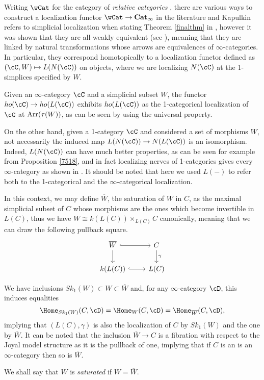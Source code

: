 \begin{rmk}
  Writing $\wCat$ for the category of \emph{relative categories}
  \cite{BK12}, there are various ways to construct a localization functor
  $\wCat\rightarrow\Cat_\infty$ in the literature and Kapulkin refers to
  simplicial localization when stating Theorem \ref{finalthm} in
  \cite{Kap14}, however it was shown that they are all weakly equivalent (see
  \cite[Ex.\ 1.6.3]{Bar16}), meaning
  that they are linked by natural transformations whose arrows are equivalences
  of $\infty$-categories. In particular, they correspond homotopically to a
  localization functor defined as $(\cC,W)\mapsto L(N(\cC))$ on objects, where
  we are localizing $N(\cC)$ at the 1-simplices specified by $W$.
\end{rmk}

\begin{rmk}

  Given an $\infty$-category $\cC$ and a simplicial subset $W$, the functor
  $ho(\cC)\rightarrow ho(L(\cC))$ exhibits $ho(L(\cC))$ as the
  1-categorical localization of $\cC$ at $\operatorname{Arr}(\tau(W))$, as can be seen by
  using the universal property.

  On the other hand, given a 1-category $\cC$ and considered a set of
  morphisms $W$, not necessarily the induced map $L(N(\cC))\rightarrow
  N(L(\cC))$ is an isomorphism. Indeed, $L(N(\cC))$ can have much better
  properties, as can be seen for example from Proposition \ref{7518}, and in
  fact localizing nerves of 1-categories gives every $\infty$-category as shown
  in \cite[Prop.\ 7.3.15]{Cis19}. It should be noted that here we used $L(-)$
  to refer both to the 1-categorical and the $\infty$-categorical localization.
\end{rmk}
\begin{rmk}\label{715}

  In this context, we may define $\overline{W}$, the saturation of $W$ in $C$,
  as the maximal simplicial subset of $C$
  whose morphisms are the ones which become invertible in $L(C)$, thus we have
  $\overline{W}\cong k(L(C))\times_{L(C)}C$ canonically, meaning that we can
  draw the following pullback square.
  \[\begin{tikzcd}
    {\overline{W}} & C \\
    {k(L(C))} & {L(C)}
    \arrow[hook, from=2-1, to=2-2]
    \arrow["\gamma", from=1-2, to=2-2]
    \arrow[hook, from=1-1, to=1-2]
    \arrow[from=1-1, to=2-1]
  \end{tikzcd}\]

  We have inclusions $Sk_1(W)\subset W\subset\overline{W}$ and, for any
  $\infty$-category $\cD$, this induces equalities
  \[\Home_{Sk_1(W)}(C,\cD)=\Home_{W}(C,\cD)=\Home_{\overline{W}}(C,\cD),\]
  implying that $(L(C),\gamma)$ is also the localization of $C$ by $Sk_1(W)$
  and the one by $\overline{W}$. It can be noted that the inclusion
  $\overline{W}\rightarrow C$ is a fibration with respect to the Joyal model
  structure as it is the pullback of one, implying that if $C$ is an is an
  $\infty$-category then so is $\overline{W}$.

  We shall say that $W$ is \emph{saturated} if $W=\overline{W}$.
\end{rmk}

